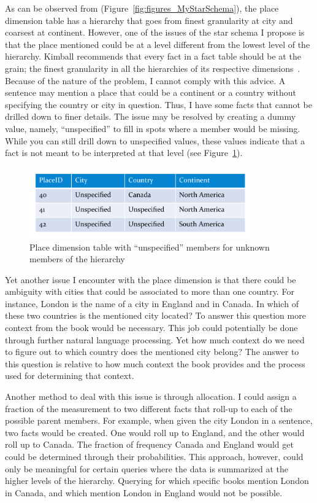 As can be observed from (Figure~\ref{fig:figures_MyStarSchema}), the place dimension table has a hierarchy that goes from finest granularity at city and
coarsest at continent. However, one of the issues of the star schema I propose is that the place mentioned could be at a level different from the lowest level
of the hierarchy. Kimball recommends that every fact in a fact table should be at the grain; the finest granularity in all the hierarchies of its respective
dimensions~\cite{kimball2002dwt}. Because of the nature of the problem, I cannot comply with this advice. A sentence may mention a place that could be a
continent or a country without specifying the country or city in question. Thus, I have some facts that cannot be drilled down to finer details. The issue
may be resolved by creating a dummy value, namely, ``unspecified'' to fill in spots where a member would be missing. While you can still drill down to
unspecified values, these values indicate that a fact is not meant to be interpreted at that level (see Figure~\ref{fig:figures_UnspecifiedValue}).

\begin{figure}[htbp]
    \centering
        \includegraphics[height=1.2in]{figures/UnspecifiedValue.pdf}
    \caption{Place dimension table with ``unspecified'' members for unknown members of the hierarchy}
    \label{fig:figures_UnspecifiedValue}
\end{figure}

Yet another issue I encounter with the place dimension is that there could be ambiguity with cities that could be associated to more than one country. For
instance, London is the name of a city in England and in Canada. In which of these two countries is the mentioned city located? To answer this question more
context from the book would be necessary. This job could potentially be done through further natural language processing. Yet how much context do we need to
figure out to which country does the mentioned city belong? The answer to this question is relative to how much context the book provides and the process used
for determining that context.

Another method to deal with this issue is through allocation. I could assign a fraction of the measurement to two different facts that roll-up to each of the
possible parent members. For example, when given the city London in a sentence, two facts would be created. One would roll up to England, and the other would
roll up to Canada. The fraction of frequency Canada and England would get could be determined through their probabilities. This approach, however, could only
be meaningful for certain queries where the data is summarized at the higher levels of the hierarchy. Querying for which specific books mention London in
Canada, and which mention London in England would not be possible.

